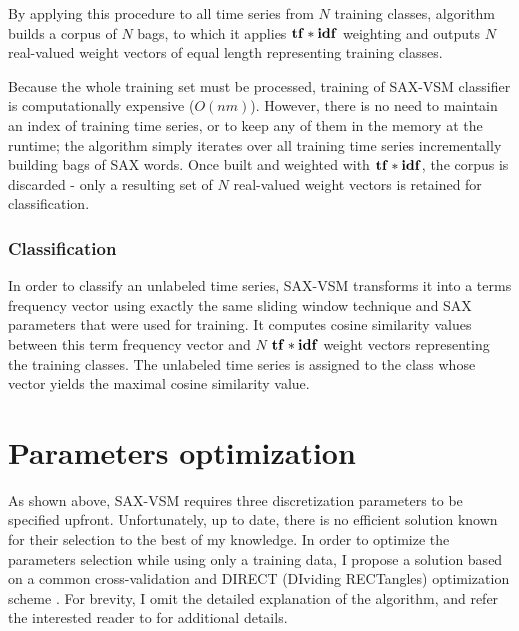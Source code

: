 By applying this procedure to all time series from $N$ training classes, 
algorithm builds a corpus of $N$ bags, to which it applies $\text{\textbf{tf}}\ast\text{\textbf{idf}}$ 
weighting and outputs $N$ real-valued weight vectors of equal length 
representing training classes. 

Because the whole training set must be processed, 
training of SAX-VSM classifier is computationally expensive ($O(nm)$). 
However, there is no need to maintain an index of training time series, 
or to keep any of them in the memory at the runtime;
the algorithm simply iterates over all training time series incrementally building 
bags of SAX words. Once built and weighted with $\text{\textbf{tf}}\ast\text{\textbf{idf}}$, 
the corpus is discarded - only a resulting set of $N$ real-valued weight vectors 
is retained for classification.

\subsubsection{Classification}
In order to classify an unlabeled time series, SAX-VSM transforms it into a
terms frequency vector using exactly the same sliding window technique 
and SAX parameters that were used for training. 
It computes cosine similarity values between this term frequency vector 
and $N$ $\text{\textbf{tf}}\ast\text{\textbf{idf}}$ weight vectors representing the training classes. 
The unlabeled time series is assigned to the class whose vector yields the
maximal cosine similarity value.

\section{Parameters optimization} \label{section-direct}
As shown above, SAX-VSM requires three discretization parameters to be specified upfront. 
Unfortunately, up to date, there is no efficient solution known for their selection to the best 
of my knowledge. In order to optimize the parameters selection while using only a training data, 
I propose a solution based on a common cross-validation and DIRECT (DIviding RECTangles) 
optimization scheme \cite{citeulike:4210208}. For brevity, I omit the detailed explanation 
of the algorithm, and refer the interested reader to \cite{citeulike:12563460} for additional details.

